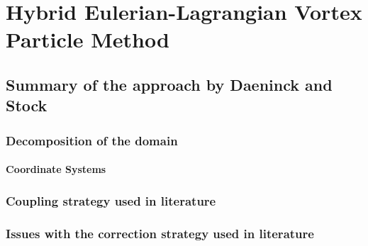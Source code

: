 \chapter{Hybrid Eulerian-Lagrangian Vortex Particle Method}



\section{Summary of the approach by Daeninck and Stock}


	\subsection{Decomposition of the domain}
	
	
		\subsubsection*{Coordinate Systems}
	


	\subsection{Coupling strategy used in literature}
	
	\subsection{Issues with the correction strategy used in literature }			
